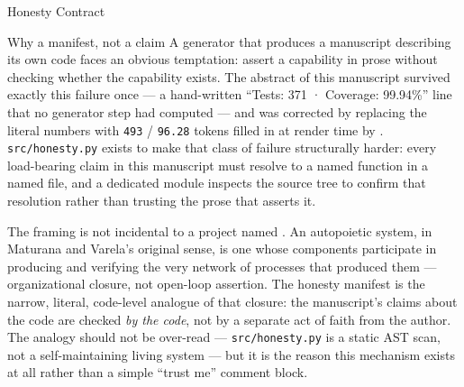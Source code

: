 \documentclass[
  ignorenonframetext,
]{beamer}
\author{\texorpdfstring{}{}}
\date{}
\begin{document}
\begin{frame}{Honesty Contract}
\protect{}\label{honesty-contract}
\begin{block}{Why a manifest, not a claim}
\protect{}\label{why-a-manifest-not-a-claim}
A generator that produces a manuscript describing its own code faces an
obvious temptation: assert a capability in prose without checking
whether the capability exists. The abstract of this manuscript survived
exactly this failure once --- a hand-written ``Tests: 371 · Coverage:
99.94\%'' line that no generator step had computed --- and was corrected
by replacing the literal numbers with \texttt{493} / \texttt{96.28}
tokens filled in at render time by
. \texttt{src/honesty.py}
exists to make that class of failure structurally harder: every
load-bearing claim in this manuscript must resolve to a named function
in a named file, and a dedicated module inspects the source tree to
confirm that resolution rather than trusting the prose that asserts it.

The framing is not incidental to a project named
. An autopoietic system, in Maturana and
Varela's original sense, is one whose components participate in
producing and verifying the very network of processes that produced them
 --- organizational closure, not open-loop
assertion. The honesty manifest is the narrow, literal, code-level
analogue of that closure: the manuscript's claims about the code are
checked \emph{by the code}, not by a separate act of faith from the
author. The analogy should not be over-read --- \texttt{src/honesty.py}
is a static AST scan, not a self-maintaining living system --- but it is
the reason this mechanism exists at all rather than a simple ``trust
me'' comment block.
\end{block}


\end{frame}
\end{document}
